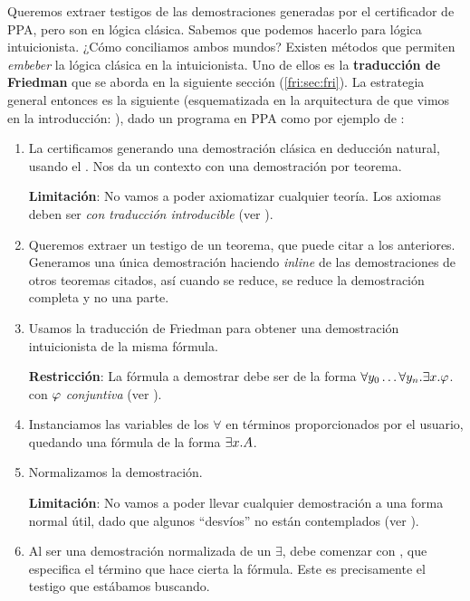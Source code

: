 Queremos extraer testigos de las demostraciones generadas por el certificador de
PPA, pero son en lógica clásica. Sabemos que podemos hacerlo para lógica
intuicionista. ¿Cómo conciliamos ambos mundos? Existen métodos que permiten
\textit{embeber} la lógica clásica en la intuicionista. Uno de ellos es la
\textbf{traducción de Friedman} que se aborda en la siguiente sección (\ref{fri:sec:fri}). La
estrategia general entonces es la siguiente (esquematizada en la arquitectura de \ppaTool{} que vimos en la introducción: ), dado un programa en PPA como
por ejemplo de :
\begin{enumerate}
    \item La certificamos generando una demostración clásica en deducción
          natural, usando el \modCertifier{}. Nos da un contexto con una demostración
          por teorema.

          \textbf{Limitación}: No vamos a poder axiomatizar cualquier teoría. Los axiomas deben ser \textit{con traducción introducible} (ver ).
    \item Queremos extraer un testigo de un teorema, que puede citar a los anteriores. Generamos una única demostración haciendo \textit{inline} de las demostraciones de otros teoremas citados, así cuando se reduce, se reduce la demostración completa y no una parte.
    \item Usamos la traducción de Friedman para obtener una demostración
          intuicionista de la misma fórmula.

          \textbf{Restricción}: La fórmula a demostrar debe ser de la forma
          $\forall y_0 \dots \forall y_n . \exists x . \varphi$. con $\varphi$ \textit{conjuntiva} (ver ).
    \item Instanciamos las variables de los $\forall$ en términos proporcionados
          por el usuario, quedando una fórmula de la forma $\exists x . A$.
    \item Normalizamos la demostración.

          \textbf{Limitación}: No vamos a poder llevar cualquier demostración a una forma normal útil, dado que algunos ``desvíos'' no están contemplados (ver ).

    \item Al ser una demostración normalizada de un $\exists$, debe comenzar con
          , que especifica el término que hace cierta la fórmula. Este
          es precisamente el testigo que estábamos buscando.
          \proofTreeExistsI
\end{enumerate}

